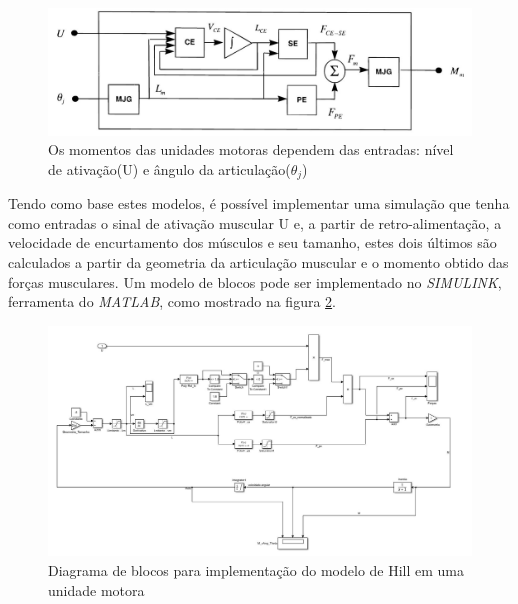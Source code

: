 \begin{figure}[H]
\centering
\includegraphics[width = 1\textwidth]{img/Rosend_Modelo.JPG}
\caption[Modelo de Blocos para Obtenção do Ângulo das Articulações - Rosen]{Os momentos das unidades motoras dependem das entradas: nível de ativação(U) e ângulo da articulação($\theta_j$)\cite{rosen1999performances}}
\label{modelo_rosen}
\end{figure}

Tendo como base estes modelos, é possível implementar uma simulação que tenha como entradas o sinal de ativação muscular U e, a partir de retro-alimentação, a velocidade de encurtamento dos músculos e seu tamanho, estes dois últimos são calculados a partir da geometria da articulação muscular e o momento obtido das forças musculares. Um modelo de blocos pode ser implementado no \textit{SIMULINK}, ferramenta do \textit{MATLAB}, como mostrado na figura \ref{modelo_simulink}.

\begin{figure}[H]
\centering
\includegraphics[width = 1\textwidth]{img/Modelo_Unidade.JPG}
\caption[Modelo de Blocos para Obtenção do Ângulo das Articulações - Simulink]{Diagrama de blocos para implementação do modelo de Hill em uma unidade motora}
\label{modelo_simulink}
\end{figure}

